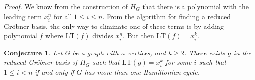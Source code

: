 \documentclass[letterpaper]{article}
\newtheorem{conjecture}{Conjecture}
\begin{document}
\emph{Proof.} We know from the construction of $H_G$ that there is a polynomial with the leading term $x_i^n$ for all $1 \leq i \leq n$. From the algorithm for finding a reduced Gr\"obner basis, the only way to eliminate one of these terms is by adding polynomial $f$ where $\mathrm{LT}(f)$ divides $x_i^n$. But then $\mathrm{LT}(f) = x_i^k$.

\begin{conjecture}
	Let $G$ be a graph with $n$ vertices, and $k \geq 2$. There exists $g$ in the reduced Gr\"obner basis of $H_G$ such that $\mathrm{LT}(g) = x_i^k$ for some $i$ such that $1 \leq i < n$ if and only if $G$ has more than one Hamiltonian cycle.
\end{conjecture}
\end{document}
